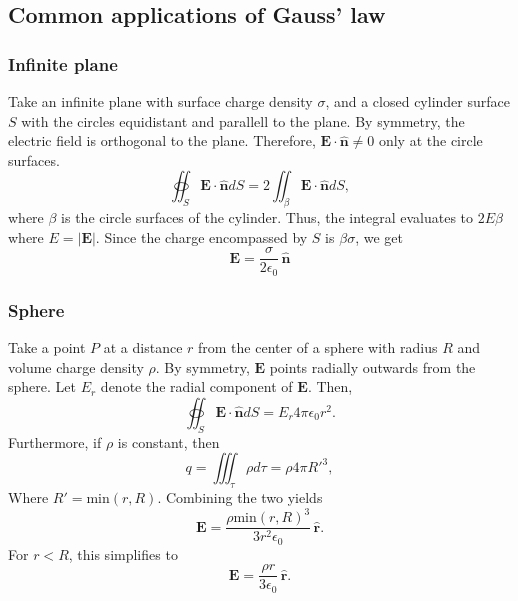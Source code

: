 \documentclass[a4paper, 12pt]{article}
\renewcommand{\vec}[1]{\bm{#1}}
\newcommand{\E}{\ensuremath{\vec{E}}}
\newcommand{\e}{\ensuremath{\epsilon_0}}
\let\tmp\hat
\renewcommand{\hat}[1]{\vec{\tmp{#1}}}
\begin{document}
\subsection{Common applications of Gauss' law}
    \subsubsection{Infinite plane}
        Take an infinite plane with surface charge density $\sigma$, 
        and a closed cylinder surface $S$ with the circles equidistant and parallell to the plane. 
        By symmetry, the electric field is orthogonal to the plane. Therefore, $\E\cdot\hat{n} \neq 0$ only at the circle surfaces. 
        \begin{equation*}
            \oiint_S \E\cdot\hat{n}dS = 2\iint_\beta \E\cdot\hat{n}dS,
        \end{equation*}
        where $\beta$ is the circle surfaces of the cylinder. Thus, the integral evaluates to $2E\beta$ where $E = |\E|$. 
        Since the charge encompassed by $S$ is $\beta\sigma$, we get
        \begin{equation}
            \E = \frac{\sigma}{2\e}\,\hat{n}
        \end{equation}

    \subsubsection{Sphere}
        Take a point $P$ at a distance $r$ from the center of a sphere with radius $R$ and volume charge density $\rho$. 
        By symmetry, $\E$ points radially outwards from the sphere. Let $E_r$ denote the radial component of $\E$. Then, 
        \begin{equation*}
            \oiint_S \E\cdot\hat{n}dS = E_r4\pi\e r^2.
        \end{equation*}
        Furthermore, if $\rho$ is constant, then
        \begin{equation*}
            q = \iiint_\tau \rho d\tau = \rho4\pi R'^3,
        \end{equation*}
        Where $R' = \text{min}(r, R)$. Combining the two yields
        \begin{equation}
            \E = \frac{\rho \text{min}(r, R)^3}{3r^2\e}\,\hat{r}.
        \end{equation}
        For $r < R$, this simplifies to
        \begin{equation}
            \E = \frac{\rho r}{3\e}\,\hat{r}.
        \end{equation}
\end{document}
